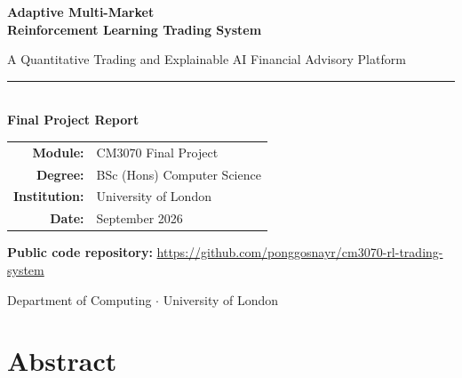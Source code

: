\documentclass[11pt,a4paper]{article}
\begin{document}
\begin{titlepage}
    \centering
    \vspace*{1.5cm}
    
    {\Huge\bfseries Adaptive Multi-Market\\[0.4em] Reinforcement Learning Trading System \par}
    \vspace{1.0cm}
    
    {\large A Quantitative Trading and Explainable AI Financial Advisory Platform\par}
    
    \vspace{2.5cm}
    
    \rule{0.7\textwidth}{1.2pt}\\[1.5cm]
    
    {\Large\bfseries Final Project Report}\\[1.0cm]
    
    \begin{tabular}{rl}
        \textbf{Module:} & CM3070 Final Project \\
        \textbf{Degree:} & BSc (Hons) Computer Science \\
        \textbf{Institution:} & University of London \\
        \textbf{Date:} & September 2026
    \end{tabular}\par
    \vspace{0.6cm}
    {\small\textbf{Public code repository:} \url{https://github.com/ponggosnayr/cm3070-rl-trading-system}\par}
    
    \vfill
    
    {\small Department of Computing $\cdot$ University of London \par}
\end{titlepage}


\section*{Abstract}
\end{document}

